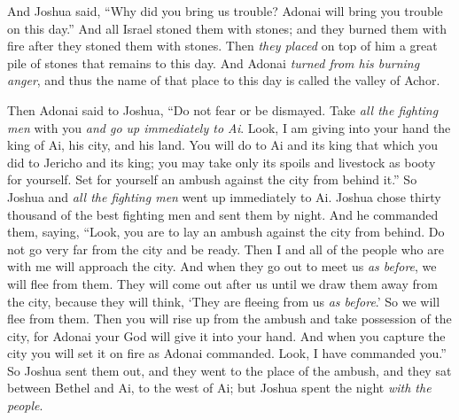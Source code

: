 \begin{biblechapter}
\verse And Joshua said, “Why did you bring us trouble? Adonai will bring you trouble on this day.” And all Israel stoned them with stones; and they burned them with fire after they stoned them with stones.
\verse Then \textit{they placed} on top of him a great pile of stones that remains to this day. And Adonai \textit{turned from his burning anger}, and thus the name of that place to this day is called the valley of Achor.
\end{biblechapter}

\begin{biblechapter} %
 Then Adonai said to Joshua, “Do not fear or be dismayed. Take \textit{all the fighting men} with you \textit{and go up immediately to Ai}. Look, I am giving into your hand the king of Ai, his city, and his land.
\verse You will do to Ai and its king that which you did to Jericho and its king; you may take only its spoils and livestock as booty for yourself. Set for yourself an ambush against the city from behind it.”
\verse So Joshua and \textit{all the fighting men} went up immediately to Ai. Joshua chose thirty thousand of the best fighting men and sent them by night.
\verse And he commanded them, saying, “Look, you are to lay an ambush against the city from behind. Do not go very far from the city and be ready.
\verse Then I and all of the people who are with me will approach the city. And when they go out to meet us \textit{as before}, we will flee from them.
\verse They will come out after us until we draw them away from the city, because they will think, ‘They are fleeing from us \textit{as before}.’ So we will flee from them.
\verse Then you will rise up from the ambush and take possession of the city, for Adonai your God will give it into your hand.
\verse And when you capture the city you will set it on fire as Adonai commanded. Look, I have commanded you.”
\verse So Joshua sent them out, and they went to the place of the ambush, and they sat between Bethel and Ai, to the west of Ai; but Joshua spent the night \textit{with the people}.

\end{biblechapter}
